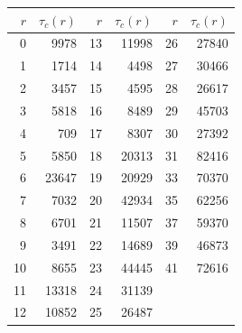 \begin{center}\begin{tabular}{rr@{\qquad}rr@{\qquad}rr}
\toprule $r$ & $\tau_c(r)$ & $r$ & $\tau_c(r)$ & $r$ & $\tau_c(r)$\\\midrule
0 & 9978 & 13 & 11998 & 26 & 27840\\
1 & 1714 & 14 & 4498 & 27 & 30466\\
2 & 3457 & 15 & 4595 & 28 & 26617\\
3 & 5818 & 16 & 8489 & 29 & 45703\\
4 & 709 & 17 & 8307 & 30 & 27392\\
5 & 5850 & 18 & 20313 & 31 & 82416\\
6 & 23647 & 19 & 20929 & 33 & 70370\\
7 & 7032 & 20 & 42934 & 35 & 62256\\
8 & 6701 & 21 & 11507 & 37 & 59370\\
9 & 3491 & 22 & 14689 & 39 & 46873\\
10 & 8655 & 23 & 44445 & 41 & 72616\\
11 & 13318 & 24 & 31139 &  & \\
12 & 10852 & 25 & 26487 &  & \\
\bottomrule\end{tabular}\end{center}
